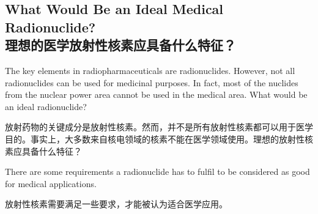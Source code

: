 \documentclass[dvipsnames, svgnames,a4paper,11pt]{article}
\begin{document}
\subsection{What Would Be an Ideal Medical Radionuclide?\\理想的医学放射性核素应具备什么特征？}


The key elements in radiopharmaceuticals are radionuclides. However, not all radionuclides can be used for medicinal purposes. In fact, most of the nuclides from the nuclear power area cannot be used in the medical area. What would be an ideal radionuclide?

放射药物的关键成分是放射性核素。然而，并不是所有放射性核素都可以用于医学目的。事实上，大多数来自核电领域的核素不能在医学领域使用。理想的放射性核素应具备什么特征？

There are some requirements a radionuclide has to fulfil to be considered as good for medical applications.

放射性核素需要满足一些要求，才能被认为适合医学应用。
\end{document}
